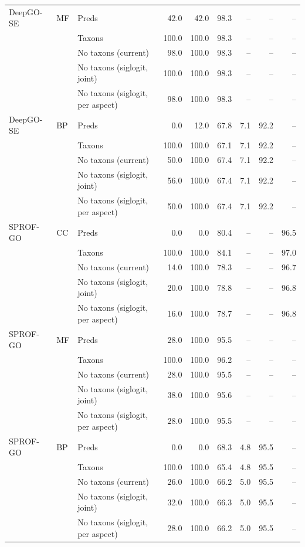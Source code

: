 \begin{tabular}{lllrrrrrr}
DeepGO-SE & MF & Preds & 42.0 & 42.0 & 98.3 & -- & -- & -- \\
 &  & Taxons & 100.0 & 100.0 & 98.3 & -- & -- & -- \\
 &  & No taxons (current) & 98.0 & 100.0 & 98.3 & -- & -- & -- \\
 &  & No taxons (siglogit, joint) & 100.0 & 100.0 & 98.3 & -- & -- & -- \\
 &  & No taxons (siglogit, per aspect) & 98.0 & 100.0 & 98.3 & -- & -- & -- \\
\addlinespace
DeepGO-SE & BP & Preds & 0.0 & 12.0 & 67.8 & 7.1 & 92.2 & -- \\
 &  & Taxons & 100.0 & 100.0 & 67.1 & 7.1 & 92.2 & -- \\
 &  & No taxons (current) & 50.0 & 100.0 & 67.4 & 7.1 & 92.2 & -- \\
 &  & No taxons (siglogit, joint) & 56.0 & 100.0 & 67.4 & 7.1 & 92.2 & -- \\
 &  & No taxons (siglogit, per aspect) & 50.0 & 100.0 & 67.4 & 7.1 & 92.2 & -- \\
\midrule
SPROF-GO & CC & Preds & 0.0 & 0.0 & 80.4 & -- & -- & 96.5 \\
 &  & Taxons & 100.0 & 100.0 & 84.1 & -- & -- & 97.0 \\
 &  & No taxons (current) & 14.0 & 100.0 & 78.3 & -- & -- & 96.7 \\
 &  & No taxons (siglogit, joint) & 20.0 & 100.0 & 78.8 & -- & -- & 96.8 \\
 &  & No taxons (siglogit, per aspect) & 16.0 & 100.0 & 78.7 & -- & -- & 96.8 \\
\addlinespace
SPROF-GO & MF & Preds & 28.0 & 100.0 & 95.5 & -- & -- & -- \\
 &  & Taxons & 100.0 & 100.0 & 96.2 & -- & -- & -- \\
 &  & No taxons (current) & 28.0 & 100.0 & 95.5 & -- & -- & -- \\
 &  & No taxons (siglogit, joint) & 38.0 & 100.0 & 95.6 & -- & -- & -- \\
 &  & No taxons (siglogit, per aspect) & 28.0 & 100.0 & 95.5 & -- & -- & -- \\
\addlinespace
SPROF-GO & BP & Preds & 0.0 & 0.0 & 68.3 & 4.8 & 95.5 & -- \\
 &  & Taxons & 100.0 & 100.0 & 65.4 & 4.8 & 95.5 & -- \\
 &  & No taxons (current) & 26.0 & 100.0 & 66.2 & 5.0 & 95.5 & -- \\
 &  & No taxons (siglogit, joint) & 32.0 & 100.0 & 66.3 & 5.0 & 95.5 & -- \\
 &  & No taxons (siglogit, per aspect) & 28.0 & 100.0 & 66.2 & 5.0 & 95.5 & -- \\
\bottomrule
\end{tabular}
